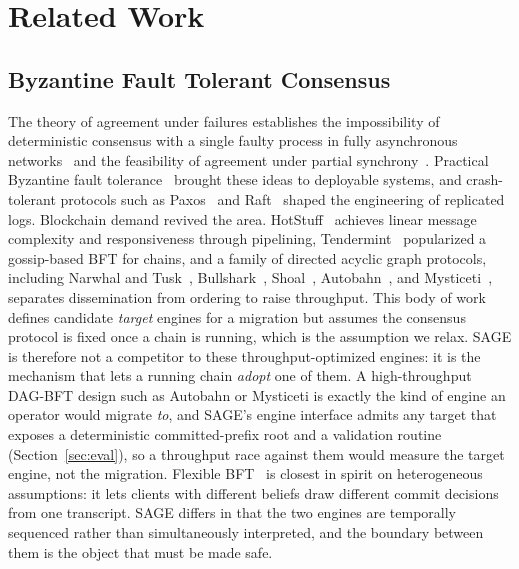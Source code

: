 \documentclass[journal]{IEEEtran}
\theoremstyle{remark}
\begin{document}
\section{Related Work}
\label{sec:related}

\subsection{Byzantine Fault Tolerant Consensus}
The theory of agreement under failures establishes the impossibility of deterministic
consensus with a single faulty process in fully asynchronous networks~\cite{flp} and the
feasibility of agreement under partial synchrony~\cite{dls}. Practical Byzantine fault
tolerance~\cite{pbft} brought these ideas to deployable systems, and crash-tolerant
protocols such as Paxos~\cite{paxos} and Raft~\cite{raft} shaped the engineering of
replicated logs. Blockchain demand revived the area. HotStuff~\cite{hotstuff} achieves
linear message complexity and responsiveness through pipelining, Tendermint~\cite{tendermint}
popularized a gossip-based BFT for chains, and a family of directed acyclic graph protocols,
including Narwhal and Tusk~\cite{narwhal}, Bullshark~\cite{bullshark}, Shoal~\cite{shoal},
Autobahn~\cite{autobahn}, and Mysticeti~\cite{mysticeti}, separates dissemination from
ordering to raise throughput. This body of work defines candidate \emph{target} engines for a
migration but assumes the consensus protocol is fixed once a chain is running, which is the
assumption we relax. SAGE is therefore not a competitor to these throughput-optimized
engines: it is the mechanism that lets a running chain \emph{adopt} one of them. A
high-throughput DAG-BFT design such as Autobahn or Mysticeti is exactly the kind of engine an
operator would migrate \emph{to}, and SAGE's engine interface admits any target that exposes a
deterministic committed-prefix root and a validation routine (Section~\ref{sec:eval}), so a
throughput race against them would measure the target engine, not the migration. Flexible
BFT~\cite{flexbft} is closest in spirit on heterogeneous
assumptions: it lets clients with different beliefs draw different commit decisions from one
transcript. SAGE differs in that the two engines are temporally sequenced rather than
simultaneously interpreted, and the boundary between them is the object that must be made
safe.
\end{document}
